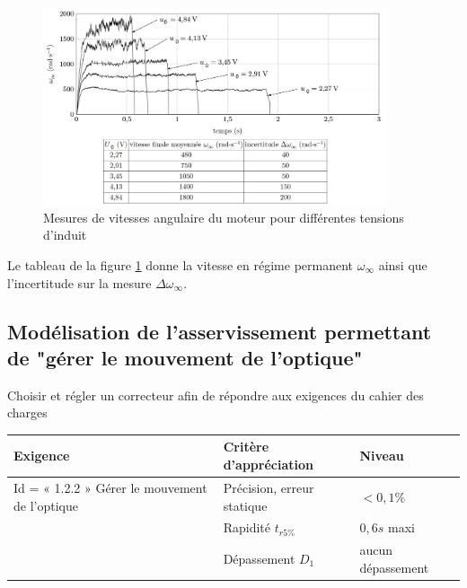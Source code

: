 \begin{figure}[!htb]
\begin{center}
\includegraphics[width=0.9\textwidth]{images/image_fig13.jpg}
\caption{Mesures de vitesses angulaire du moteur pour différentes tensions d’induit \label{fig13}}
\end{center}
\end{figure}




Le tableau de la figure \ref{fig13} donne la vitesse en régime permanent $\omega_{\infty}$ ainsi que l'incertitude sur la mesure $\Delta \omega_{\infty}$.






\subsection{Modélisation de l'asservissement permettant de "gérer le mouvement de l'optique"}

\begin{objectif}
Choisir et régler un correcteur afin de répondre aux exigences du cahier des charges
\end{objectif}

\begin{tabular}{|p{}|p{}|p{}|}
\hline 
\textbf{Exigence} & \textbf{Critère d'appréciation} & \textbf{Niveau} \\ 
\hline 
Id = « 1.2.2 » Gérer le mouvement de l'optique & Précision, erreur statique & $<0,1\%$ \\ 
\cline{2-3}
& Rapidité $t_{r5\%}$ & $0,6s$ maxi \\ 
\cline{2-3}
& Dépassement $D_1$ & aucun dépassement \\ 
\hline 
\end{tabular} 


